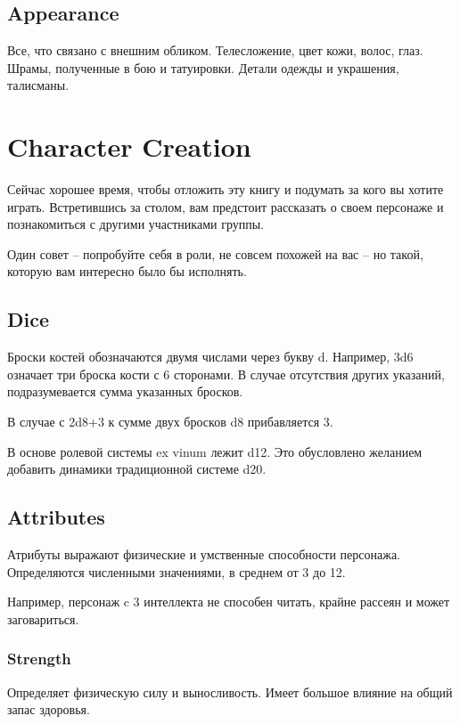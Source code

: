 \documentclass[a5paper,11pt]{book}
\begin{document}
\begin{multicols}{2}
\section{Appearance}
Все, что связано с внешним обликом. Телесложение, цвет кожи, волос, глаз. Шрамы, полученные в бою и татуировки. Детали одежды и украшения, талисманы.



\end{multicols}
\chapter{Character Creation}
\begin{multicols}{2}

\lettrine{С}{}ейчас хорошее время, чтобы отложить эту книгу и подумать за кого вы хотите играть. Встретившись за столом, вам предстоит рассказать о своем персонаже и познакомиться с другими участниками группы.

Один совет -- попробуйте себя в роли, не совсем похожей на вас -- но такой, которую вам интересно было бы исполнять.

\section{Dice}

Броски костей обозначаются двумя числами через букву d. Например, 3d6 означает три броска кости с 6 сторонами. В случае отсутствия других указаний, подразумевается сумма указанных бросков.

В случае с 2d8+3 к сумме двух бросков d8 прибавляется 3.

В основе ролевой системы ex vinum лежит d12. Это обусловлено желанием добавить динамики традиционной системе d20.

\section{Attributes}
Атрибуты выражают физические и умственные способности персонажа. Определяются численными значениями, в среднем от 3 до 12.

Например, персонаж c 3 интеллекта не способен читать, крайне рассеян и может заговариться.

\subsection{Strength}
Определяет физическую силу и выносливость. Имеет большое влияние на общий запас здоровья.


\end{multicols}
\end{document}
